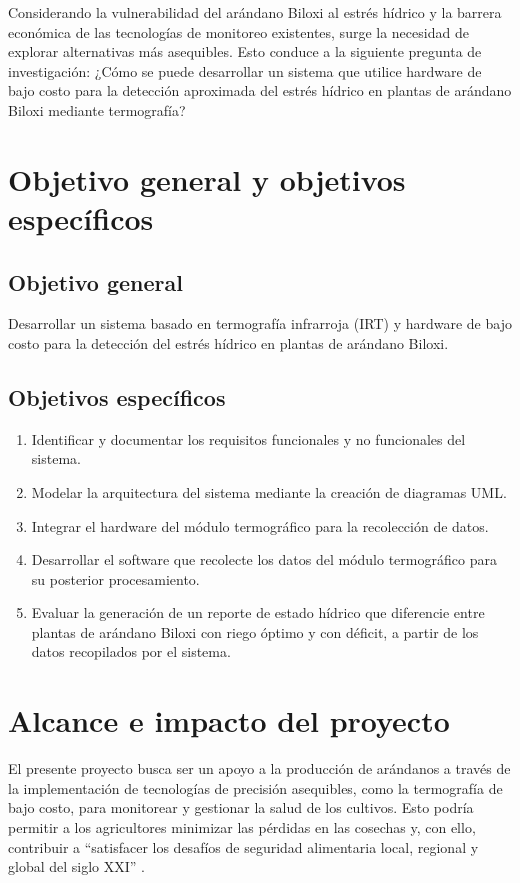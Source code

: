 Considerando la vulnerabilidad del arándano Biloxi al estrés hídrico y la barrera económica de las tecnologías de monitoreo existentes, surge la necesidad de explorar alternativas más asequibles. Esto conduce a la siguiente pregunta de investigación: ¿Cómo se puede desarrollar un sistema que utilice hardware de bajo costo para la detección aproximada del estrés hídrico en plantas de arándano Biloxi mediante termografía?


\section{Objetivo general y objetivos específicos}
\subsection{Objetivo general}
Desarrollar un sistema basado en termografía infrarroja (IRT) y hardware de bajo costo para la detección del estrés hídrico en plantas de arándano Biloxi.

\subsection{Objetivos específicos}
\begin{enumerate}
    \item Identificar y documentar los requisitos funcionales y no funcionales del sistema.
    \item Modelar la arquitectura del sistema mediante la creación de diagramas UML.
    \item Integrar el hardware del módulo termográfico para la recolección de datos.
    \item Desarrollar el software que recolecte los datos del módulo termográfico para su posterior procesamiento.
    \item Evaluar la generación de un reporte de estado hídrico que diferencie entre plantas de arándano Biloxi con riego óptimo y con déficit, a partir de los datos recopilados por el sistema.
\end{enumerate}

\section{Alcance e impacto del proyecto }
\label{sec:impacto}

El presente proyecto busca ser un apoyo a la producción de arándanos a través de la implementación de tecnologías de precisión asequibles, como la termografía de bajo costo, para monitorear y gestionar la salud de los cultivos. Esto podría permitir a los agricultores minimizar las pérdidas en las cosechas y, con ello, contribuir a ``satisfacer los desafíos de seguridad alimentaria local, regional y global del siglo XXI'' .

